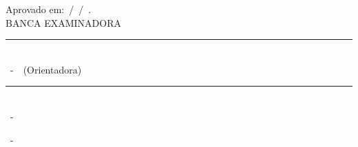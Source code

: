 \begin{folhadeaprovacao}
   \begin{center}
   {
   Aprovado em:~\imprimirdia /\ \imprimirmes/\ \imprimirano.\\
   \vspace{1cm}
   BANCA EXAMINADORA
    \vspace{1cm}
    \vfill
          \rule{15cm}{.1pt} \\
      {\imprimirorientador}~-~{\imprimirttorientador}~(Orientadora) 
      \vfill
      \rule{15cm}{.1pt} \\
      {\imprimirexaminadorum}~-~{\imprimirttexaminadorum} %
        \vfill
        \ifdefvoid{\imprimirexaminadordois}{}{
        \rule{15cm}{.1pt} \\
        \imprimirexaminadordois~-~\imprimirttexaminadordois %
	\vfill
        }
        \ifdefvoid{\imprimirexaminadortres}{}{
        \rule{15cm}{.1pt} \\
        \imprimirexaminadortres~-~\imprimirttexaminadortres %
	\vfill
        }
        \ifdefvoid{\imprimirexaminadorquatro}{}{
        \rule{15cm}{.1pt} \\
        \imprimirexaminadorquatro~-~\imprimirttexaminadorquatro %
        }
   }
   \vfill
   {\imprimirlocal~- \imprimiruf \\ \imprimirano}
   \end{center} 
\end{folhadeaprovacao}
